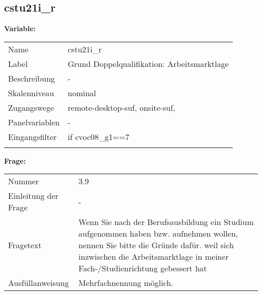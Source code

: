 	
	
	\subsection{cstu21i\_r}
	\label{subSection:cstu21i_r}

	\noindent\textbf{Variable:}\\
		\begin{tabular}{lL{11.3cm}}
			\label{tableVariable:cstu21i_r}
			Name & cstu21i\_r \\
			Label & Grund Doppelqualifikation: Arbeitsmarktlage \\
			Beschreibung & - \\
			Skalenniveau & nominal \\
			Zugangswege &
				remote-desktop-suf,
				onsite-suf,
 \\
			Panelvariablen & -
			 \\
			Eingangsfilter & if cvoc08\_g1==7 \\
 \\
		\end{tabular}

		\vspace*{1 cm}
		\noindent\textbf{Frage:}\\
		\begin{tabular}{lL{11.3cm}}
			\label{tableQuestion:cstu21i_r}
			Nummer & 3.9 \\
			Einleitung der Frage & - \\
			Fragetext & Wenn Sie nach der Berufsausbildung ein Studium aufgenommen haben bzw. aufnehmen wollen, nennen Sie bitte die Gründe dafür. 
weil sich inzwischen die Arbeitsmarktlage in meiner Fach-/Studienrichtung gebessert hat \\
			Ausfüllanweisung & Mehrfachnennung möglich. \\
		\end{tabular}





